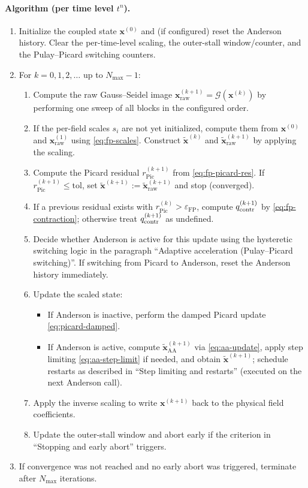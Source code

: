 \paragraph{Algorithm (per time level $t^n$).}
\begin{enumerate}
  \item Initialize the coupled state $\mathbf{x}^{(0)}$ and (if configured) reset the Anderson history. Clear the per-time-level scaling, the outer-stall window/counter, and the Pulay--Picard switching counters.
  \item For $k=0,1,2,\dots$ up to $N_{\max}-1$:
  \begin{enumerate}
    \item Compute the raw Gauss--Seidel image $\mathbf{x}_{\mathrm{raw}}^{(k+1)}=\mathcal{G}(\mathbf{x}^{(k)})$ by performing one sweep of all blocks in the configured order.
    \item If the per-field scales $s_i$ are not yet initialized, compute them from $\mathbf{x}^{(0)}$ and $\mathbf{x}_{\mathrm{raw}}^{(1)}$ using \eqref{eq:fp-scales}. Construct $\widetilde{\mathbf{x}}^{(k)}$ and $\widetilde{\mathbf{x}}_{\mathrm{raw}}^{(k+1)}$ by applying the scaling.
    \item Compute the Picard residual $r_{\mathrm{Pic}}^{(k+1)}$ from \eqref{eq:fp-picard-res}. If $r_{\mathrm{Pic}}^{(k+1)}\le \mathrm{tol}$, set $\widetilde{\mathbf{x}}^{(k+1)}:=\widetilde{\mathbf{x}}_{\mathrm{raw}}^{(k+1)}$ and stop (converged).
    \item If a previous residual exists with $r_{\mathrm{Pic}}^{(k)}>\varepsilon_{\mathrm{FP}}$, compute $q_{\mathrm{contr}}^{(k+1)}$ by \eqref{eq:fp-contraction}; otherwise treat $q_{\mathrm{contr}}^{(k+1)}$ as undefined.
    \item Decide whether Anderson is active for this update using the hysteretic switching logic in the paragraph ``Adaptive acceleration (Pulay--Picard switching)''. If switching from Picard to Anderson, reset the Anderson history immediately.
    \item Update the scaled state:
    \begin{itemize}
      \item If Anderson is inactive, perform the damped Picard update \eqref{eq:picard-damped}.
      \item If Anderson is active, compute $\widetilde{\mathbf{x}}_{\mathrm{AA}}^{(k+1)}$ via \eqref{eq:aa-update}, apply step limiting \eqref{eq:aa-step-limit} if needed, and obtain $\widetilde{\mathbf{x}}^{(k+1)}$; schedule restarts as described in ``Step limiting and restarts'' (executed on the next Anderson call).
    \end{itemize}
    \item Apply the inverse scaling to write $\mathbf{x}^{(k+1)}$ back to the physical field coefficients.
    \item Update the outer-stall window and abort early if the criterion in ``Stopping and early abort'' triggers.
  \end{enumerate}
  \item If convergence was not reached and no early abort was triggered, terminate after $N_{\max}$ iterations.
\end{enumerate}
